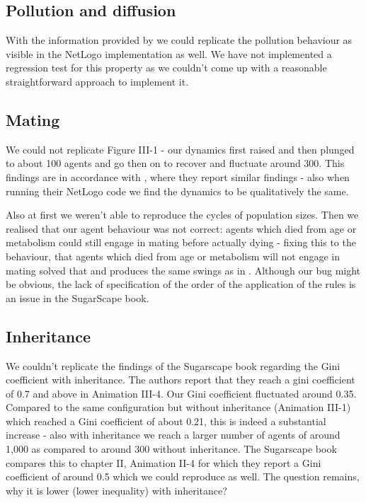 \subsection{Pollution and diffusion}
With the information provided by \cite{weaver_replicating_2009} we could replicate the pollution behaviour as visible in the NetLogo implementation as well. We have not implemented a regression test for this property as we couldn't come up with a reasonable straightforward approach to implement it.



\subsection{Mating}
We could not replicate Figure III-1 - our dynamics first raised and then plunged to about 100 agents and go then on to recover and fluctuate around 300. This findings are in accordance with \cite{weaver_replicating_2009}, where they report similar findings - also when running their NetLogo code we find the dynamics to be qualitatively the same.

Also at first we weren't able to reproduce the cycles of population sizes. Then we realised that our agent behaviour was not correct: agents which died from age or metabolism could still engage in mating before actually dying - fixing this to the behaviour, that agents which died from age or metabolism will not engage in mating solved that and produces the same swings as in \cite{weaver_replicating_2009}. Although our bug might be obvious, the lack of specification of the order of the application of the rules is an issue in the SugarScape book.

\subsection{Inheritance}
We couldn't replicate the findings of the Sugarscape book regarding the Gini coefficient with inheritance. The authors report that they reach a gini coefficient of 0.7 and above in Animation III-4. Our Gini coefficient fluctuated around 0.35. Compared to the same configuration but without inheritance (Animation III-1) which reached a Gini coefficient of about 0.21, this is indeed a substantial increase - also with inheritance we reach a larger number of agents of around 1,000 as compared to around 300 without inheritance.
The Sugarscape book compares this to chapter II, Animation II-4 for which they report a Gini coefficient of around 0.5 which we could reproduce as well. The question remains, why it is lower (lower inequality) with inheritance?

